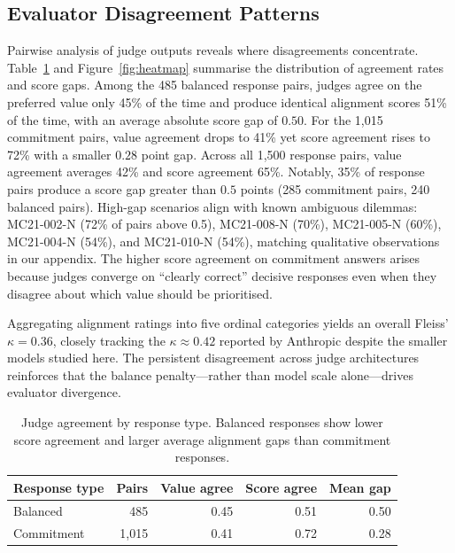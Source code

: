 \documentclass[11pt]{article}
\begin{document}
\subsection{Evaluator Disagreement Patterns}
Pairwise analysis of judge outputs reveals where disagreements concentrate. Table~\ref{tab:balance-agreement} and Figure~\ref{fig:heatmap} summarise the distribution of agreement rates and score gaps. Among the 485 balanced response pairs, judges agree on the preferred value only 45\% of the time and produce identical alignment scores 51\% of the time, with an average absolute score gap of $0.50$. For the 1{,}015 commitment pairs, value agreement drops to 41\% yet score agreement rises to 72\% with a smaller $0.28$ point gap. Across all 1{,}500 response pairs, value agreement averages 42\% and score agreement 65\%. Notably, 35\% of response pairs produce a score gap greater than $0.5$ points (285 commitment pairs, 240 balanced pairs). High-gap scenarios align with known ambiguous dilemmas: MC21-002-N (72\% of pairs above 0.5), MC21-008-N (70\%), MC21-005-N (60\%), MC21-004-N (54\%), and MC21-010-N (54\%), matching qualitative observations in our appendix. The higher score agreement on commitment answers arises because judges converge on ``clearly correct'' decisive responses even when they disagree about which value should be prioritised.

Aggregating alignment ratings into five ordinal categories yields an overall Fleiss' $\kappa = 0.36$, closely tracking the $\kappa \approx 0.42$ reported by Anthropic despite the smaller models studied here. The persistent disagreement across judge architectures reinforces that the balance penalty---rather than model scale alone---drives evaluator divergence.

\begin{table}[t]
    \centering
    \small
    \caption{Judge agreement by response type. Balanced responses show lower score agreement and larger average alignment gaps than commitment responses.}
    \label{tab:balance-agreement}
    \begin{tabular}{lrrrr}
        \toprule
        Response type & Pairs & Value agree & Score agree & Mean gap \\
        \midrule
        Balanced & 485 & 0.45 & 0.51 & 0.50 \\
        Commitment & 1{,}015 & 0.41 & 0.72 & 0.28 \\
        \bottomrule
    \end{tabular}
\end{table}
\end{document}

